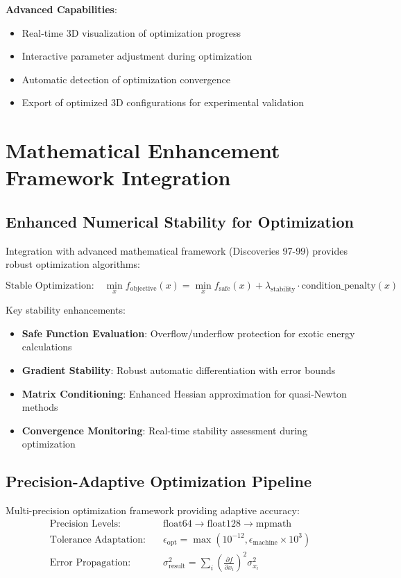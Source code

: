 \documentclass[11pt,a4paper]{article}
\begin{document}
\textbf{Advanced Capabilities}:
\begin{itemize}
\item Real-time 3D visualization of optimization progress
\item Interactive parameter adjustment during optimization
\item Automatic detection of optimization convergence
\item Export of optimized 3D configurations for experimental validation
\end{itemize}

\section{Mathematical Enhancement Framework Integration}

\subsection{Enhanced Numerical Stability for Optimization}

Integration with advanced mathematical framework (Discoveries 97-99) provides robust optimization algorithms:

\begin{equation}
\text{Stable Optimization:} \quad \min_{x} f_{\text{objective}}(x) = \min_{x} f_{\text{safe}}(x) + \lambda_{\text{stability}} \cdot \text{condition\_penalty}(x)
\end{equation}

Key stability enhancements:
\begin{itemize}
\item \textbf{Safe Function Evaluation}: Overflow/underflow protection for exotic energy calculations
\item \textbf{Gradient Stability}: Robust automatic differentiation with error bounds
\item \textbf{Matrix Conditioning}: Enhanced Hessian approximation for quasi-Newton methods
\item \textbf{Convergence Monitoring}: Real-time stability assessment during optimization
\end{itemize}

\subsection{Precision-Adaptive Optimization Pipeline}

Multi-precision optimization framework providing adaptive accuracy:
\begin{align}
\text{Precision Levels:} \quad &\text{float64} \rightarrow \text{float128} \rightarrow \text{mpmath} \\
\text{Tolerance Adaptation:} \quad &\epsilon_{\text{opt}} = \max(10^{-12}, \epsilon_{\text{machine}} \times 10^3) \\
\text{Error Propagation:} \quad &\sigma_{\text{result}}^2 = \sum_i \left(\frac{\partial f}{\partial x_i}\right)^2 \sigma_{x_i}^2
\end{align}
\end{document}

